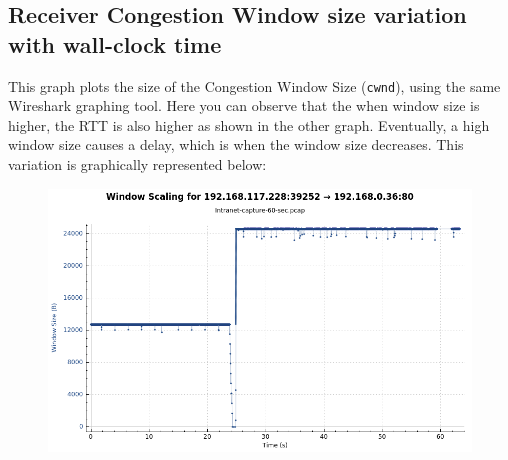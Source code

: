 \documentclass{article}
\begin{document}
\subsection{Receiver Congestion Window size variation with wall-clock time}
\begin{flushleft}
This graph plots the size of the Congestion Window Size (\texttt{cwnd}), using the same Wireshark graphing tool. Here you can observe that the when window size is higher, the RTT is also higher as shown in the other graph. Eventually, a high window size causes a delay, which is when the window size decreases. This variation is graphically represented below:
\begin{figure}[H]
\centering
\includegraphics[width=0.55\linewidth]{Window-size-variation-60-sec-capture-Ubuntu.png}
\end{figure}
\end{flushleft}
\end{document}
